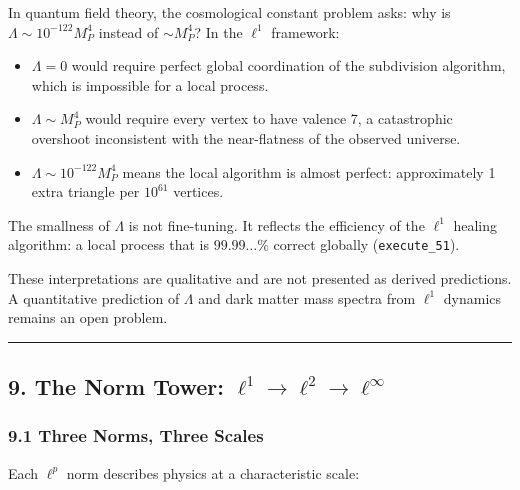 \documentclass[
]{article}
\providecommand{\tightlist}{%
  \setlength{\itemsep}{0pt}\setlength{\parskip}{0pt}}
\begin{document}
In quantum field theory, the cosmological constant problem asks: why is
\(\Lambda \sim 10^{-122} M_P^4\) instead of \(\sim M_P^4\)? In the
\(\ell^1\) framework:

\begin{itemize}
\tightlist
\item
  \(\Lambda = 0\) would require perfect global coordination of the
  subdivision algorithm, which is impossible for a local process.
\item
  \(\Lambda \sim M_P^4\) would require every vertex to have valence 7, a
  catastrophic overshoot inconsistent with the near-flatness of the
  observed universe.
\item
  \(\Lambda \sim 10^{-122} M_P^4\) means the local algorithm is almost
  perfect: approximately 1 extra triangle per \(10^{61}\) vertices.
\end{itemize}

The smallness of \(\Lambda\) is not fine-tuning. It reflects the
efficiency of the \(\ell^1\) healing algorithm: a local process that is
\(99.99\ldots\%\) correct globally (\texttt{execute\_51}).

These interpretations are qualitative and are not presented as derived
predictions. A quantitative prediction of \(\Lambda\) and dark matter
mass spectra from \(\ell^1\) dynamics remains an open problem.

\begin{center}\rule{0.5\linewidth}{0.5pt}\end{center}

\hypertarget{the-norm-tower-ell1-to-ell2-to-ellinfty}{%
\subsection{\texorpdfstring{9. The Norm Tower:
\(\ell^1 \to \ell^2 \to \ell^\infty\)}{9. The Norm Tower: \textbackslash ell\^{}1 \textbackslash to \textbackslash ell\^{}2 \textbackslash to \textbackslash ell\^{}\textbackslash infty}}\label{the-norm-tower-ell1-to-ell2-to-ellinfty}}

\hypertarget{three-norms-three-scales}{%
\subsubsection{9.1 Three Norms, Three
Scales}\label{three-norms-three-scales}}

Each \(\ell^p\) norm describes physics at a characteristic scale:
\end{document}
